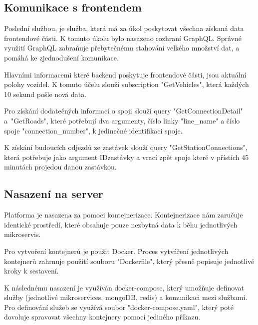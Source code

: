 \subsection {Komunikace s frontendem}\label{mainBackend}
Poslední službou, je služba, která má za úkol poskytovat všechna získaná data frontendové části. K tomuto úkolu bylo nasazeno rozhraní GraphQL. Správné využití GraphQL zabraňuje přebytečnému stahování velkého množství dat, a pomáhá ke zjednodušení komunikace.\par
Hlavními informacemi které backend poskytuje frontendové části, jsou aktuální polohy vozidel. K tomuto účelu slouží subscription "GetVehicles", která každých 10 sekund pošle nová data.\par
Pro získání dodatečných informací o spoji slouží query "\mbox{GetConnectionDetail}" \newline a~"\mbox{GetRoads}", které potřebují dva argumenty, číslo linky "\mbox{line\_name}" \newline a číslo spoje "\mbox{connection\_number}", k jedinečné identifikaci spoje.\par
K získání budoucích odjezdů ze zastávek slouží query "GetStationConnections", která potřebuje jako argument IDzastávky a vrací zpět spoje které v přístích 45 minutách projedou danou zastávkou.
\subsection{Nasazení na server}
Platforma je nasazena za pomoci kontejnerizace. Kontejnerizace nám zaručuje identické prostředí, které obsahuje pouze nezbytná data k běhu jednotlivých mikroservis.\par
Pro vytvoření kontejnerů je použit Docker. Proces vytváření jednotlivých kontejnerů zahrnuje použití souboru "Dockerfile", který přesně popisuje jednotlivé kroky k sestavení.\par
K následnému nasazení je využíván docker-compose, který umožňuje definovat služby (jednotlivé mikroservices, mongoDB, redis) a komunikaci mezi službami. Pro definování služeb se využívá soubor "docker-compose.yaml", který poté dovoluje spravovat všechny kontejnery pomocí jediného příkazu.
